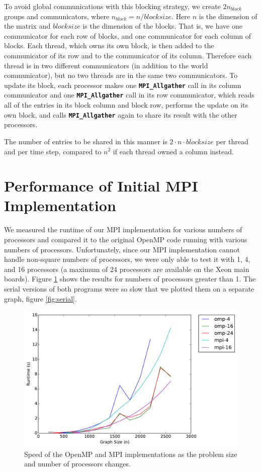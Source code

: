 \documentclass[11pt]{article}
\begin{document}
To avoid global communications with this blocking strategy, we create $2n_{block}$ groups and communicators, where $n_{block}=n/blocksize$. 
Here $n$ is the dimension of the matrix and $blocksize$ is the dimension of the blocks. 
That is, we have one communicator for each row of blocks, and one communicator for each column of blocks. 
Each thread, which owns its own block, is then added to the communicator of its row and to the communicator of its column. 
Therefore each thread is in two different communicators (in addition to the world communicator), but no two threads are in the same two communicators.
To update its block, each processor makes one \textbf{\texttt{MPI\_Allgather}} call in its column communicator and one \textbf{ \texttt{MPI\_Allgather}} call in its row communicator, which reads all of the entries in its block column and block row, performs the update on its own block, and calls \textbf{\texttt{MPI\_Allgather}} again to share its result with the other processors.

The number of entries to be shared in this manner is $2 \cdot n \cdot blocksize$ per thread and per time step, compared to $n^2$ if each thread owned a column instead.

\section{Performance of Initial MPI Implementation}
We measured the runtime of our MPI implementation for various numbers of processors and compared it to the original OpenMP code running with various numbers of processors.
Unfortunately, since our MPI implementation cannot handle non-square numbers of processors, we were only able to test it with 1, 4, and 16 processors (a maximum of 24 processors are available on the Xeon main boards).
Figure \ref{fig:mpi-omp} shows the results for numbers of processors greater than 1.
The serial versions of both programs were so slow that we plotted them on a separate graph, figure \ref{fig:serial}.

\begin{figure}[h]
	\centering
	\includegraphics[width=.7\textwidth]{mpi_omp_comparison.pdf}
	\caption{Speed of the OpenMP and MPI implementations as the problem size and number of processors changes.}
	\label{fig:mpi-omp}
\end{figure}
\end{document}
